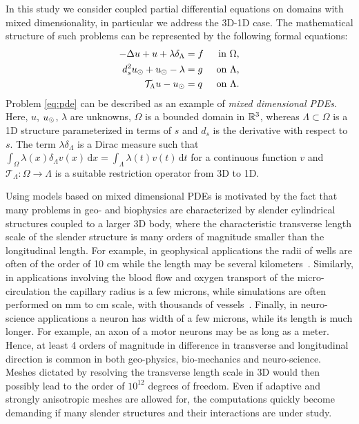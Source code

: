 \documentclass[r]{siamart171218}
\newcommand{\paoloold}[1]{{\color{black}#1}}
\begin{document}
In this study we consider coupled partial differential equations on domains with mixed dimensionality, in particular we address the  3D-1D case. The mathematical structure of such problems can be represented by the following formal equations:
\begin{subequations}
\label{eq:pde}
\begin{align}
\label{eq:pde1}
  -\Delta u + u + \lambda \delta_{\Lambda} &= f &\mbox{ in } \Omega,\\
\label{eq:pde2}
 d_s^2 \ud + \ud - \lambda &= g &\mbox{ on } \Lambda,\\
\label{eq:coupling}
\mathcal{T}_\Lambda u - \ud  &=  \paoloold{q} &\mbox{ on } \Lambda . 
\end{align}
\end{subequations}
Problem \eqref{eq:pde} can be described as an example of \emph{mixed dimensional PDEs}.
Here, $u$, $u_{\odot}$,  $\lambda$ are unknowns,  $\Omega$ is a bounded domain in $\mathbb{R}^3$, whereas $\Lambda \subset \Omega$ is a 1D structure
parameterized in terms of $s$ and $d_s$ is the derivative with respect to $s$. 
The term $\lambda\delta_{\Lambda}$ is a Dirac measure such that 
$\int_{\Omega}\lambda(x)\delta_{\Lambda}v(x)\,\mathrm{d}x=\int_{\Lambda}\lambda(t)v(t) \,\mathrm{d}t$
for a continuous function $v$ and $\mathcal{T}_\Lambda: \Omega\rightarrow\Lambda$ is a suitable restriction operator from 3D to 1D. 

Using models based on mixed dimensional PDEs is motivated by the fact that many problems in geo- and biophysics are characterized by slender cylindrical structures coupled to a larger 3D body, where the characteristic transverse length scale of the slender structure is many orders of magnitude smaller than the longitudinal length.  For example, in geophysical applications the radii of wells are often of the order of 10 cm while the length may be several kilometers~\cite{Peaceman1978183, Peaceman1983531}. Similarly, in applications involving the blood flow and oxygen transport of the micro-circulation the capillary radius is a few microns, while simulations are often performed on mm to cm scale, with thousands of vessels~\cite{berg2020modelling,fang2008oxygen,gould2017capillary, secomb2004green}. Finally, in neuro-science applications a neuron has width of a few microns, while  its length is much longer. For example, an axon of a motor neurons may be as long as a meter.  Hence,  at least 4 orders of magnitude in difference in transverse and longitudinal direction is common in both geo-physics, bio-mechanics and neuro-science. Meshes dictated by resolving the transverse length scale in 3D would then possibly lead to the order of $10^{12}$ degrees of freedom. Even if adaptive and strongly anisotropic meshes are allowed for, the computations quickly become demanding if many slender structures and their interactions are under study.  
\end{document}
